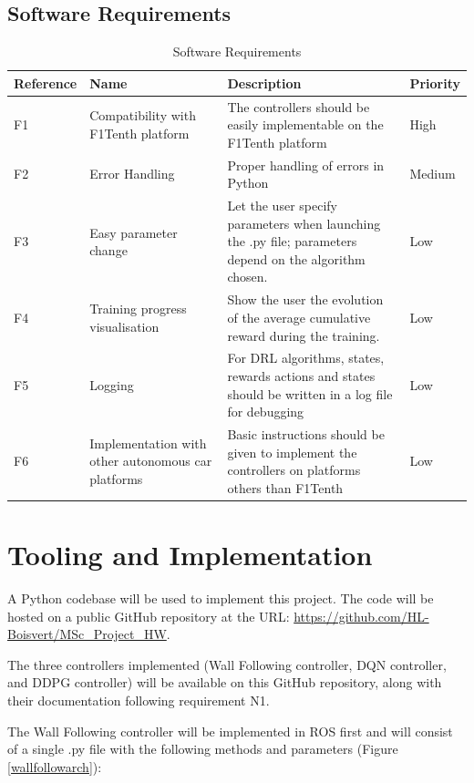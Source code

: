 \subsection{Software Requirements}
\label{softreq}

\begin{table}
\centering
\begin{tabularx}{\textwidth}{||l|X|X|l||} 
 \hline
 Reference & Name & Description & Priority\\ [0.5ex] 
 \hline\hline
 F1 & Compatibility with F1Tenth platform & The controllers should be easily implementable on the F1Tenth platform & High\\
 \hline
 F2 & Error Handling & Proper handling of errors in Python & Medium\\
 \hline
 F3 & Easy parameter change & Let the user specify parameters when launching the .py file; parameters depend on the algorithm chosen. & Low\\
 \hline
 F4 & Training progress visualisation & Show the user the evolution of the average cumulative reward during the training. & Low\\
 \hline
 F5 &  Logging & For DRL algorithms, states, rewards actions and states should be written in a log file for debugging & Low \\
 \hline
 F6 &  Implementation with other autonomous car platforms & Basic instructions should be given to implement the controllers on platforms others than F1Tenth & Low \\ [1ex]
 \hline

\end{tabularx}
\caption{Software Requirements}
\label{sofreqtab}
\end{table}

\section{Tooling and Implementation}
\label{toolimp}

A Python codebase will be used to implement this project. The code will be hosted on a public GitHub repository at the URL: \url{https://github.com/HL-Boisvert/MSc_Project_HW}. \newline

The three controllers implemented (Wall Following controller, DQN controller, and DDPG controller) will be available on this GitHub repository, along with their documentation following requirement N1.

The Wall Following controller will be implemented in ROS first and will consist of a single .py file with the following methods and parameters (Figure \ref{wallfollowarch}):

